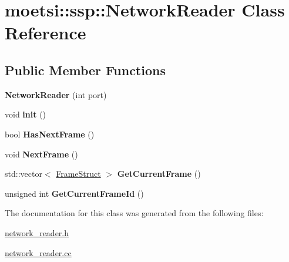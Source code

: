 \hypertarget{classmoetsi_1_1ssp_1_1NetworkReader}{}\section{moetsi\+:\+:ssp\+:\+:Network\+Reader Class Reference}
\label{classmoetsi_1_1ssp_1_1NetworkReader}
\subsection*{Public Member Functions}
\begin{DoxyCompactItemize}
\item 
\mbox{\label{classmoetsi_1_1ssp_1_1NetworkReader_a9bdd3780ddd272cfcbc906d720e86c83}} 
{\bfseries Network\+Reader} (int port)
\item 
\mbox{\label{classmoetsi_1_1ssp_1_1NetworkReader_adfb4188f382d0659d49ff1cecdc5300c}} 
void {\bfseries init} ()
\item 
\mbox{\label{classmoetsi_1_1ssp_1_1NetworkReader_aa13257b597a09567e0c05b076377df71}} 
bool {\bfseries Has\+Next\+Frame} ()
\item 
\mbox{\label{classmoetsi_1_1ssp_1_1NetworkReader_a874a26e90dc4be7d65e69bdb6f8756c1}} 
void {\bfseries Next\+Frame} ()
\item 
\mbox{\label{classmoetsi_1_1ssp_1_1NetworkReader_aba016077f99da855240a9b181c9ee2d6}} 
std\+::vector$<$ \hyperlink{structmoetsi_1_1ssp_1_1FrameStruct}{Frame\+Struct} $>$ {\bfseries Get\+Current\+Frame} ()
\item 
\mbox{\label{classmoetsi_1_1ssp_1_1NetworkReader_a165115474912210dfbf05dc11f0222bd}} 
unsigned int {\bfseries Get\+Current\+Frame\+Id} ()
\end{DoxyCompactItemize}


The documentation for this class was generated from the following files\+:\begin{DoxyCompactItemize}
\item 
\hyperlink{network__reader_8h}{network\+\_\+reader.\+h}\item 
\hyperlink{network__reader_8cc}{network\+\_\+reader.\+cc}\end{DoxyCompactItemize}
